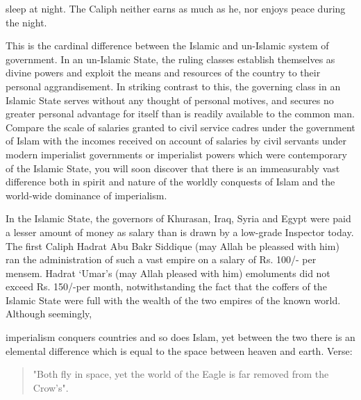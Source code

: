 sleep at night. The Caliph neither earns as much as he, nor enjoys peace
during the night.

This is the cardinal difference between the Islamic and un-Islamic
system of government. In an un-Islamic State, the ruling classes
establish themselves as divine powers and exploit the means and
resources of the country to their personal aggrandisement. In striking
contrast to this, the governing class in an Islamic State serves without
any thought of personal motives, and secures no greater personal
advantage for itself than is readily available to the common man.
Compare the scale of salaries granted to civil service cadres under the
government of Islam with the incomes received on account of salaries by
civil servants under modern imperialist governments or imperialist
powers which were contemporary of the Islamic State, you will soon
discover that there is an immeasurably vast difference both in spirit
and nature of the worldly conquests of Islam and the world-wide
dominance of imperialism.

In the Islamic State, the governors of Khurasan, Iraq, Syria and Egypt
were paid a lesser amount of money as salary than is drawn by a
low-grade Inspector today. The first Caliph Hadrat Abu Bakr Siddique
(may Allah be pleassed with him) ran the administration of such a vast
empire on a salary of Rs. 100/- per mensem. Hadrat `Umar's (may Allah
pleased with him) emoluments did not exceed Rs. 150/-per month,
notwithstanding the fact that the coffers of the Islamic State were full
with the wealth of the two empires of the known world. Although
seemingly,

imperialism conquers countries and so does Islam, yet between the two
there is an elemental difference which is equal to the space between
heaven and earth. Verse:

\begin{quote}
"Both fly in space, yet the world of the Eagle is far removed from the
Crow's".
\end{quote}

